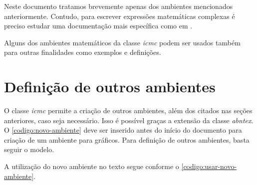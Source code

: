 Neste documento tratamos brevemente apenas dos ambientes mencionados anteriormente. Contudo, para escrever expressões matemáticas complexas é preciso estudar uma documentação mais específica como em .

Alguns dos ambientes matemáticos da classe \textit{icmc} podem ser usados também para outras finalidades como exemplos e definições.


\section{Definição de outros ambientes}
\label{secao:outros-ambientes}

O classe \textit{icmc} permite a criação de outros ambientes, além dos citados nas seções anteriores, caso seja necessário. Isso é possível graças a extensão da classe \textit{abntex}. O \autoref{codigo:novo-ambiente} deve ser inserido antes do início do documento para criação de um ambiente para gráficos. Para definição de outros ambientes, basta seguir o modelo.


\begin{codigo}[caption={Definição do ambiente \textbf{grafico}}, label={codigo:novo-ambiente}, language=Tex, breaklines=true]
\makeatletter

\newcommand{\graficoname}{Gráfico}
\newcommand{\graficorefname}{Gráfico}
\newcommand{\listofgraficosname}{Lista de gráficos}

\addto\captionsenglish{%
    \newcommand{\graficoname}{Graph}
    \newcommand{\graficorefname}{Graph}
    \newcommand{\listofgraficosname}{List of graphs}
}

\newfloat[chapter]{grafico}{logr}{\graficoname}

\renewcommand{\thegrafico}{\thechapter.\@arabic\c@grafico}
\renewcommand{\cftgraficoname}{\graficoname\space}
\renewcommand*{\cftgraficoaftersnum}{\hfill\textendash\hfill}

\makeatother
\end{codigo}

A utilização do novo ambiente no texto segue conforme o \autoref{codigo:usar-novo-ambiente}.

